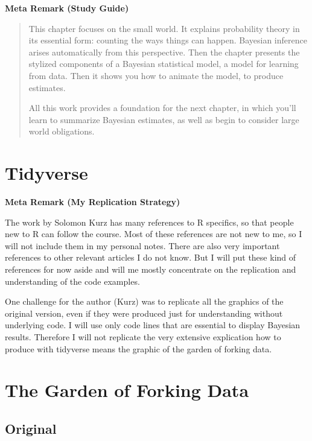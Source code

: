 \documentclass[
  letterpaper,
  DIV=11,
  numbers=noendperiod]{scrreprt}
\begin{document}
\textbf{Meta Remark (Study Guide)}

\begin{quote}
This chapter focuses on the small world. It explains probability theory
in its essential form: counting the ways things can happen. Bayesian
inference arises automatically from this perspective. Then the chapter
presents the stylized components of a Bayesian statistical model, a
model for learning from data. Then it shows you how to animate the
model, to produce estimates.

All this work provides a foundation for the next chapter, in which
you'll learn to summarize Bayesian estimates, as well as begin to
consider large world obligations.
\end{quote}

\hypertarget{tidyverse}{%
\section*{Tidyverse}\label{tidyverse}}


\textbf{Meta Remark (My Replication Strategy)}

The work by Solomon Kurz has many references to R specifics, so that
people new to R can follow the course. Most of these references are not
new to me, so I will not include them in my personal notes. There are
also very important references to other relevant articles I do not know.
But I will put these kind of references for now aside and will me mostly
concentrate on the replication and understanding of the code examples.

One challenge for the author (Kurz) was to replicate all the graphics of
the original version, even if they were produced just for understanding
without underlying code. I will use only code lines that are essential
to display Bayesian results. Therefore I will not replicate the very
extensive explication how to produce with tidyverse means the graphic of
the garden of forking data.

\hypertarget{the-garden-of-forking-data}{%
\section{The Garden of Forking Data}\label{the-garden-of-forking-data}}

\hypertarget{original-1}{%
\subsection{Original}\label{original-1}}
\end{document}
